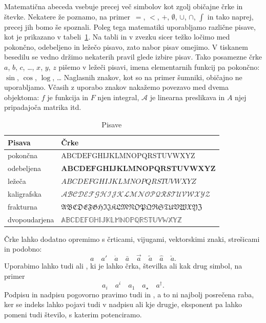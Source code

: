 Matematična abeceda vsebuje precej več simbolov kot zgolj običajne črke in števke. Nekatere že poznamo, na primer~$=$, $<$, $+$, $\emptyset$, $\cup$, $\cap$, $\int$ in tako naprej, precej jih bomo še spoznali. Poleg tega matematiki uporabljamo različne pisave, kot je prikazano v tabeli~\ref{tabela:oblike-crk}. Na tabli in v zvezku sicer težko ločimo med pokončno, odebeljeno in ležečo pisavo, zato nabor pisav omejimo. V tiskanem besedilu se vedno držimo nekaterih pravil glede izbire pisav. Tako posamezne črke $a$, $b$, $c$, \ldots, $x$, $y$, $z$ pišemo v ležeči pisavi, imena elementarnih funkcij pa pokončno: $\sin$, $\cos$, $\log$, \ldots{} Naglasnih znakov, kot so na primer šumniki, običajno ne uporabljamo. Včasih z uporabo znakov nakažemo povezavo med dvema objektoma: $f$ je funkcija in $F$ njen integral, $\mathcal{A}$ je linearna preslikava in $A$ njej pripadajoča matrika itd.

\begin{table}[ht]
\centering
\small
\begin{tabular}{ll}
  \toprule
  Pisava & Črke \\ \midrule
  pokončna      & $\mathrm{ABCDEFGHIJKLMNOPQRSTUVWXYZ}$ \\
  odebeljena    & $\mathbf{ABCDEFGHIJKLMNOPQRSTUVWXYZ}$ \\
  ležeča        & $ABCDEFGHIJKLMNOPQRSTUVWXYZ$ \\
  kaligrafska   & $\mathcal{ABCDEFGHIJKLMNOPQRSTUVWXYZ}$ \\
  frakturna     & $\mathfrak{ABCDEFGHIJKLMNOPQRSTUVWXYZ}$ \\
  dvopoudarjena & $\mathbb{ABCDEFGHIJKLMNOPQRSTUVWXYZ}$ \\
  \bottomrule
\end{tabular}
\caption{Pisave}\label{tabela:oblike-crk}
\end{table}

Črke lahko dodatno opremimo s črticami, vijugami, vektorskimi znaki, strešicami in podobno:
%
\begin{equation*}
 a \quad
 a' \quad
 \dot{a} \quad
 \bar{a} \quad
 \vec{a} \quad
 \tilde{a} \quad
 \hat{a} \quad
 \check{a}.
\end{equation*}
%
Uporabimo lahko tudi  ali
, ki je lahko črka, številka ali kak drug simbol, na primer
%
\begin{equation*}
  a_i \quad
  a^i \quad
  a_1 \quad
  a_{\star} \quad
  a^{\dagger}.
\end{equation*}
%
Podpisu in nadpisu pogovorno pravimo tudi  in , a to ni
najbolj posrečena raba, ker se indeks lahko pojavi tudi v nadpisu ali kje drugje,
eksponent pa lahko pomeni tudi število, s katerim potenciramo.

